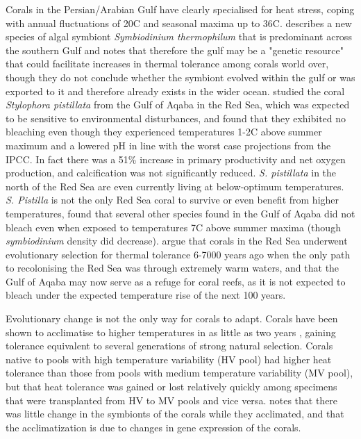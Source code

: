 \documentclass[11pt,a4paper]{article}
\begin{document}
Corals in the Persian/Arabian Gulf have clearly specialised for heat stress, coping with annual fluctuations of 20\textdegree C and seasonal maxima up to 36\textdegree C. \cite{Hume2015} describes a new species of algal symbiont \textit{Symbiodinium thermophilum} that is predominant across the southern Gulf and notes that therefore the gulf may be a "genetic resource" that could facilitate increases in thermal tolerance among corals world over, though they do not conclude whether the symbiont evolved within the gulf or was exported to it and therefore already exists in the wider ocean. \cite{Krueger2017} studied the coral \textit{Stylophora pistillata} from the Gulf of Aqaba in the Red Sea, which was expected to be sensitive to environmental disturbances, and found that they exhibited no bleaching even though they experienced temperatures 1-2\textdegree C above summer maximum and a lowered pH in line with the worst case projections from the IPCC. In fact there was a 51\% increase in primary productivity and net oxygen production, and calcification was not significantly reduced. \textit{S. pistillata} in the north of the Red Sea are even currently living at below-optimum temperatures. \textit{S. Pistilla} is not the only Red Sea coral to survive or even benefit from higher temperatures, \cite{Fine2013} found that several other species found in the Gulf of Aqaba did not bleach even when exposed to temperatures 7\textdegree C above summer maxima (though \textit{symbiodinium} density did decrease). \cite{Fine2013} argue that corals in the Red Sea underwent evolutionary selection for thermal tolerance 6-7000 years ago when the only path to recolonising the Red Sea was through extremely warm waters, and that the Gulf of Aqaba may now serve as a refuge for coral reefs, as it is not expected to bleach under the expected temperature rise of the next 100 years. 


Evolutionary change is not the only way for corals to adapt. Corals have been shown to acclimatise to higher temperatures in as little as two years \citep{Palumbi2014}, gaining tolerance equivalent to several generations of strong natural selection.  Corals native to pools with high temperature variability (HV pool) had higher heat tolerance than those from pools with medium temperature variability (MV pool), but that heat tolerance was gained or lost relatively quickly among specimens that were transplanted from HV to MV pools and vice versa. \cite{Palumbi2014} notes that there was little change in the symbionts of the corals while they acclimated, and that the acclimatization is due to changes in gene expression of the corals. 
\end{document}
